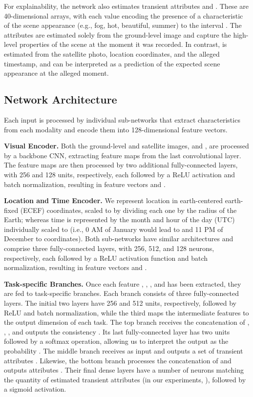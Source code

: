 \documentclass[journal]{IEEEtran}
\begin{document}
    For explainability, the network also estimates transient attributes  and . These are 40-dimensional arrays, with each value encoding the presence of a characteristic of the scene appearance (e.g., fog, hot, beautiful, summer) to the interval . The attributes  are estimated solely from the ground-level image and capture the high-level properties of the scene at the moment it was recorded. In contrast,  is estimated from the satellite photo, location coordinates, and the alleged timestamp, and can be interpreted as a prediction of the expected scene appearance at the alleged moment.
    
    \subsection{Network Architecture}
        Each input  is processed by individual sub-networks that extract characteristics from each modality and encode them into 128-dimensional feature vectors. \newline
        
        \noindent\textbf{Visual Encoder.} Both the ground-level and satellite images,  and , are processed by a backbone CNN, extracting feature maps from the last convolutional layer. The feature maps are then processed by two additional fully-connected layers, with 256 and 128 units, respectively, each followed by a ReLU activation and batch normalization, resulting in feature vectors  and . \newline
        
        \noindent\textbf{Location and Time Encoder.} We represent location  in earth-centered earth-fixed (ECEF) coordinates, scaled to  by dividing each one by the radius of the Earth; whereas time  is represented by the month and hour of the day (UTC) individually scaled to  (i.e., 0 AM of January would lead to  and 11 PM of December to  coordinates). Both sub-networks have similar architectures and comprise three fully-connected layers, with 256, 512, and 128 neurons, respectively, each followed by a ReLU activation function and batch normalization, resulting in feature vectors  and . \newline
        
        \noindent\textbf{Task-specific Branches.} Once each feature , , , and  has been extracted, they are fed to task-specific branches. Each branch consists of three fully-connected layers. The initial two layers have 256 and 512 units, respectively, followed by ReLU and batch normalization, while the third maps the intermediate features to the output dimension of each task. The top branch receives the concatenation of , , ,  and outputs the consistency . Its last fully-connected layer has two units followed by a softmax operation, allowing us to interpret the output as the probability . The middle branch receives as input  and outputs a set of transient attributes . Likewise, the bottom branch processes the concatenation of  and outputs attributes . Their final dense layers have a number of neurons matching the quantity of estimated transient attributes  (in our experiments, ), followed by a sigmoid activation.  
    
\end{document}
